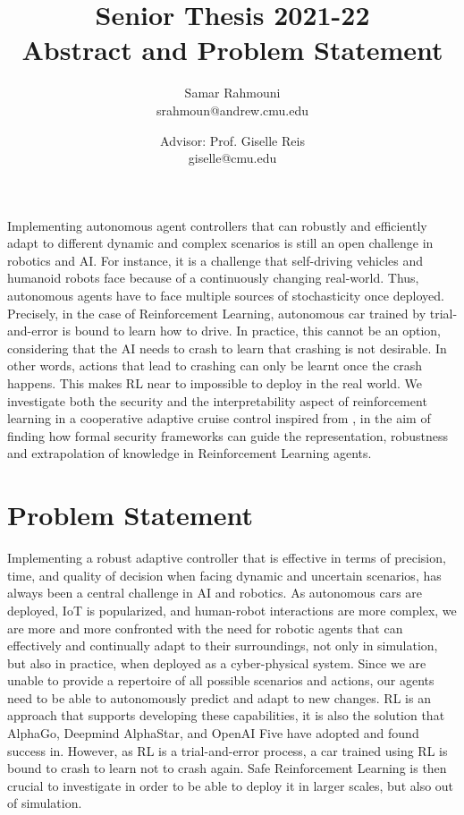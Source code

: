 \documentclass[a4paper,11pt]{article}
\author{%
  \begin{minipage}[t]{0.47\textwidth}
    \centering
    Samar Rahmouni \\ srahmoun@andrew.cmu.edu
  \end{minipage}
  \and
  \begin{minipage}[t]{0.45\textwidth}
    \centering
    Advisor: Prof. Giselle Reis \\ giselle@cmu.edu
  \end{minipage}%
  \vspace*{2ex}
}
\date{}
\title{{\Large\sc Senior Thesis 2021-22\\[2ex]}{\LARGE\bf Abstract and Problem Statement\vspace*{3ex}}}
\begin{document}
\maketitle 


Implementing autonomous agent controllers that can robustly and efficiently adapt to different dynamic
and complex scenarios is still an open challenge in robotics and AI. For instance, it is a challenge that
self-driving vehicles and humanoid robots face because of a continuously changing real-world. Thus, autonomous
agents have to face multiple sources of stochasticity once deployed.
Precisely, in the case of Reinforcement Learning, autonomous car trained by trial-and-error is bound to learn how to drive. 
In practice, this cannot be an option, considering that the AI needs to crash to learn that crashing is not desirable. In other words, 
actions that lead to crashing can only be learnt once the crash happens. This makes RL near to impossible to deploy in the real world. 
We investigate both the security and the interpretability aspect of reinforcement learning in a cooperative adaptive cruise control inspired from \cite{vnc20},
in the aim of finding how formal security frameworks can guide the representation, robustness and extrapolation of knowledge in Reinforcement
Learning agents. 

\section{Problem Statement}
Implementing a robust adaptive controller that is effective in terms of precision, time, and quality of decision
when facing dynamic and uncertain scenarios, has always been a central challenge in AI and robotics.
As autonomous cars are deployed, IoT is popularized, and human-robot interactions are more complex, we
are more and more confronted with the need for robotic agents that can effectively and continually adapt
to their surroundings, not only in simulation, but also in practice, when deployed as a cyber-physical system. 
Since we are unable to provide a repertoire of all possible scenarios and actions,
our agents need to be able to autonomously predict and adapt to new changes. RL is an approach that
supports developing these capabilities, it is also the solution that AlphaGo, Deepmind AlphaStar, and OpenAI Five have
adopted \cite{li2019reinforcement} and found success in. 
However, as RL is a trial-and-error process, a car trained using RL is bound to crash to learn not to crash again. Safe Reinforcement Learning is then crucial 
to investigate in order to be able to deploy it in larger scales, but also out of simulation. 
\end{document}
